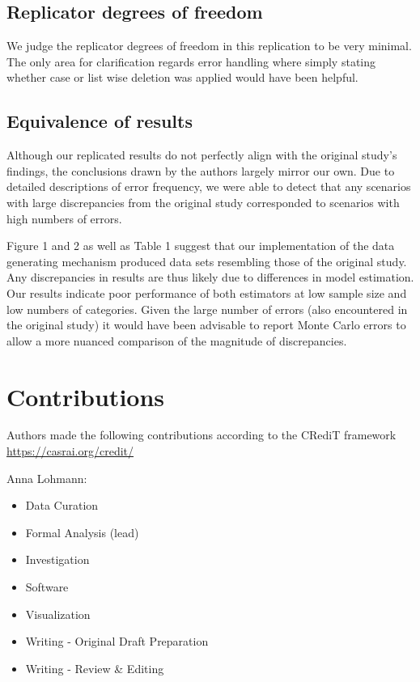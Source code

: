 \documentclass[10,a4paperpaper,]{article}
\begin{document}
\subsection{Replicator degrees of freedom}

We judge the replicator degrees of freedom in this replication to be
very minimal. The only area for clarification regards error handling
where simply stating whether case or list wise deletion was applied
would have been helpful.

\subsection{Equivalence of results}

Although our replicated results do not perfectly align with the original
study's findings, the conclusions drawn by the authors largely mirror
our own. Due to detailed descriptions of error frequency, we were able
to detect that any scenarios with large discrepancies from the original
study corresponded to scenarios with high numbers of errors.

Figure 1 and 2 as well as Table 1 suggest that our implementation of the
data generating mechanism produced data sets resembling those of the
original study. Any discrepancies in results are thus likely due to
differences in model estimation. Our results indicate poor performance
of both estimators at low sample size and low numbers of categories.
Given the large number of errors (also encountered in the original
study) it would have been advisable to report Monte Carlo errors to
allow a more nuanced comparison of the magnitude of discrepancies.

\section{Contributions}

Authors made the following contributions according to the CRediT
framework \url{https://casrai.org/credit/}

Anna Lohmann:

\begin{itemize}
\tightlist
\item
  Data Curation\\
\item
  Formal Analysis (lead)\\
\item
  Investigation\\
\item
  Software\\
\item
  Visualization
\item
  Writing - Original Draft Preparation\\
\item
  Writing - Review \& Editing
\end{itemize}
\end{document}
